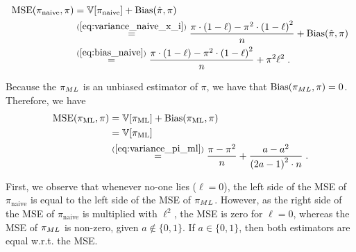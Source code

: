 \begin{align*}
    \text{MSE}(\pi_{\text{naive}}, \pi) &= \mathbb{V}[\pi_{\text{naive}}] + \text{Bias}(\hat{\pi}, \pi) \\
    &\overset{(\ref{eq:variance_naive_x_i})}{=} \frac{\pi \cdot (1-\ell) - \pi^2 \cdot {(1-\ell)}^2}{n} + \text{Bias}(\hat{\pi}, \pi) \\
    &\overset{(\ref{eq:bias_naive})}{=} \frac{\pi \cdot (1-\ell) - \pi^2 \cdot {(1-\ell)}^2}{n} + \pi^2 \ell^2
    \;.
\end{align*}

Because the $\pi_{ML}$ is an unbiased estimator of $\pi$, we have that $\text{Bias}(\pi_{ML}, \pi) = 0$.
Therefore, we have
\begin{align*}
    \text{MSE}(\pi_{\text{ML}}, \pi) &= \mathbb{V}[\pi_{\text{ML}}] + \text{Bias}(\pi_{\text{ML}}, \pi) \\
    &= \mathbb{V}[\pi_{\text{ML}}] \\
    &\overset{(\ref{eq:variance_pi_ml})}{=} \frac{\pi - \pi^2}{n} + \frac{a - a^2}{{(2a-1)}^2 \cdot n}\;.
\end{align*}

First, we observe that whenever no-one lies ($\ell = 0$), the left side of the MSE of $\pi_{\text{naive}}$ is equal to the left side of the MSE of $\pi_{ML}$. However, as the right side of the MSE of $\pi_{\text{naive}}$ is multiplied with $\ell^2$, the MSE is zero for $\ell = 0$, whereas the MSE of $\pi_{ML}$ is non-zero, given $a\notin \{0, 1\}$. If $a\in \{0, 1\}$, then both estimators are equal w.r.t. the MSE.




